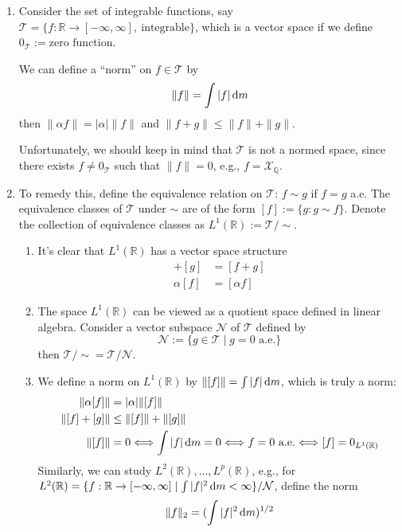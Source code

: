 \begin{remark}
\begin{enumerate}
\item
Consider the set of integrable functions, say $\mathcal{T}=\{f:\mathbb{R}\to[-\infty,\infty],\ \text{integrable}\}$, which is a vector space if we define $0_{\mathcal{T}}:=\text{zero function}$.

We can define a ``norm'' on $f\in\mathcal{T}$ by
\[
\|f\|=\int|f|\,\mathrm{d} m
\]
then $\|\alpha f\|=|\alpha|\|f\|$ and $\|f+g\|\le\|f\|+\|g\|$.

Unfortunately, we should keep in mind that $\mathcal{T}$ is not a normed space, since there exists $f\ne0_{\mathcal{T}}$ such that $\|f\|=0$, e.g., $f=\mathcal{X}_{\mathbb{Q}}$.
\item
To remedy this, define the equivalence relation on $\mathcal{T}$: $f\sim g$ if $f=g$ a.e.
The equivalence classes of $\mathcal{T}$ under $\sim$ are of the form $[f]:=\{g: g\sim f\}$. Denote the collection of equivalence classes as $L^1(\mathbb{R}) := \mathcal{T}/\sim$. 
\begin{enumerate}
\item
It's clear that $L^1(\mathbb{R})$ has a vector space structure
\begin{align*}
[f]+[g]&=[f+g]\\
\alpha[f]&=[\alpha f]
\end{align*}
\item
The space $L^1(\mathbb{R})$ can be viewed as a quotient space defined in linear algebra. Consider a vector subspace $\mathcal{N}$ of $\mathcal{T}$ defined by
\[
\mathcal{N}:=\{g\in\mathcal{T}\mid g=0\text{ a.e.}\}
\]
then $\mathcal{T}/\sim=\mathcal{T}/\mathcal{N}$.
\item
We define a norm on $L^1(\mathbb{R})$ by $\|[f]\| = \int|f|\,\mathrm{d} m$, which is truly a norm:
\begin{align*}
\|\alpha[f]\|&=|\alpha|\|[f]\|\\
\|[f]+[g]\|&\le \|[f]\|+\|[g]\|\\
\|[f]\|&=0
\Longleftrightarrow
\int|f|\,\mathrm{d} m=0
\Longleftrightarrow
f=0\text{ a.e.}
\Longleftrightarrow
[f]=0_{L^1(\mathbb{R})}
\end{align*}
Similarly, we can study $L^2(\mathbb{R}),\dots,L^p(\mathbb{R})$, e.g., for $L^2(\mathbb{R}) = \{f:\mathbb{R}\to[-\infty,\infty]\mid \int |f|^2\,\mathrm{d} m<\infty\}/\mathcal{N}$, define the norm
\[
\|f\|_2=(\int|f|^2\,\mathrm{d} m)^{1/2}
\]
\end{enumerate}
\end{enumerate}
\end{remark}

